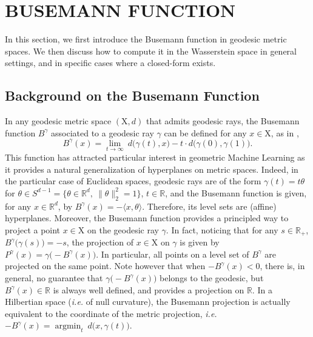 \documentclass[twoside]{article}
\DeclareMathOperator*{\argmin}{argmin}
\newcommand{\R}{\mathbb{R}}
\newcommand{\X}{\mathrm{X}}
\begin{document}
\section{BUSEMANN FUNCTION} \label{section:busemann}

 In this section, we first introduce the Busemann function in geodesic metric spaces. We then discuss how to compute it in the Wasserstein space in general settings, and in specific cases where a closed-form exists.

\subsection{Background on the Busemann Function} \label{section:bg_busemann}

In any geodesic metric space $(\X,d)$ that admits geodesic rays, the Busemann function $B^\gamma$ associated to a geodesic ray $\gamma$ can be defined for any $x\in \X$, as in \citep[II.8.17]{bridson2013metric},
\begin{equation}
    B^\gamma(x) = \lim_{t\to\infty}\ d\big(\gamma(t), x\big) - t \cdot d\big(\gamma(0), \gamma(1)\big).
\end{equation}
 This function has attracted particular interest in geometric Machine Learning as it provides a natural generalization of hyperplanes on metric spaces. Indeed, in the particular case of Euclidean spaces, geodesic rays are of the form $\gamma(t) = t\theta$ for $\theta\in S^{d-1}=\{\theta\in\R^d,\ \|\theta\|_2^2=1\}$, $t\in\R$, and the Busemann function is given, for any $x\in\R^d$, by $B^\gamma(x)=-\langle x,\theta\rangle$. Therefore, its level sets are (affine) hyperplanes. Moreover, the Busemann function provides a principled way to project a point $x\in \X$ on the geodesic ray $\gamma$. In fact, noticing that for any $s\in \R_+$, $B^\gamma\big(\gamma(s)\big)=-s$, the projection of $x\in \X$ on $\gamma$ is given by $P^\gamma(x)=\gamma\big(-B^\gamma(x)\big)$. In particular, all points on a level set of $B^\gamma$ are projected on the same point. Note however that when $-B^\gamma(x)<0$, there is, in general, no guarantee that $\gamma\big(-B^\gamma(x)\big)$ belongs to the geodesic, but $B^\gamma(x)\in\R$ is always well defined, and provides a projection on $\R$. In a Hilbertian space (\emph{i.e.} of null curvature), the Busemann projection is actually equivalent to the coordinate of the metric projection, \emph{i.e.} $-B^\gamma(x) = \argmin_{t}\ d\big(x, \gamma(t)\big)$. 
\end{document}
